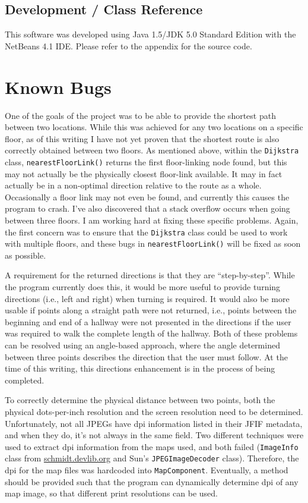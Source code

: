 \documentclass[12pt,letterpaper,titlepage]{article}   %
\begin{document}
\subsection{Development / Class Reference}
This software was developed using Java 1.5/JDK 5.0 Standard Edition with
the NetBeans 4.1 IDE. Please refer to the appendix for the source code.


\section{Known Bugs}
\label{bugs}

One of the goals of the project was to be able to provide the shortest
path between two locations. While this was achieved for any two
locations on a specific floor, as of this writing I have not yet proven
that the shortest route is also correctly obtained between two floors.
As mentioned above, within the \texttt{Dijkstra} class, 
\texttt{nearestFloorLink()}
returns the first floor-linking node found, but this may not actually be
the physically closest floor-link available. It may in fact actually be
in a non-optimal direction relative to the route as a whole.
Occasionally a floor link may not even be found, and currently this
causes the program to crash. I've also discovered that a stack overflow
occurs when going between three floors. I am working hard at fixing
these specific problems. Again, the first concern was to ensure that the
\texttt{Dijkstra} class could be used to work with multiple floors, and these
bugs in \texttt{nearestFloorLink()} will be fixed as soon as possible.

A requirement for the returned directions is that they are
``step-by-step''. While the program currently does this, it would be
more useful to provide turning directions (i.e., left and right) when
turning is required. It would also be more usable if points along a
straight path were not returned, i.e., points between the beginning and
end of a hallway were not presented in the directions if the user was
required to walk the complete length of the hallway. Both of these
problems can be resolved using an angle-based approach, where the angle
determined between three points describes the direction that the user
must follow. At the time of this writing, this directions enhancement is
in the process of being completed.

To correctly determine the physical distance between two points, both
the physical dots-per-inch resolution and the screen resolution need to
be determined. Unfortunately, not all JPEGs have dpi information listed
in their JFIF metadata, and when they do, it's not always in the same
field. Two different techniques were used to extract dpi information
from the maps used, and both failed (\texttt{ImageInfo} class from
\url{schmidt.devlib.org} and Sun's \texttt{JPEGImageDecoder} class).
Therefore, the dpi
for the map files was hardcoded into \texttt{MapComponent}. Eventually, a method
should be provided such that the program can dynamically determine dpi
of any map image, so that different print resolutions can be used.
\end{document}
